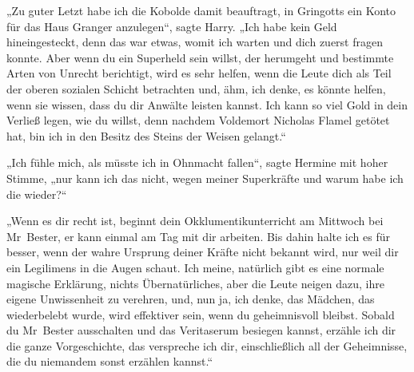 „Zu guter Letzt habe ich die Kobolde damit beauftragt, in Gringotts ein Konto für das Haus Granger anzulegen“, sagte Harry. „Ich habe kein Geld hineingesteckt, denn das war etwas, womit ich warten und dich zuerst fragen konnte. Aber wenn du ein Superheld sein willst, der herumgeht und bestimmte Arten von Unrecht berichtigt, wird es sehr helfen, wenn die Leute dich als Teil der oberen sozialen Schicht betrachten und, ähm, ich denke, es könnte helfen, wenn sie wissen, dass du dir Anwälte leisten kannst. Ich kann so viel Gold in dein Verließ legen, wie du willst, denn nachdem Voldemort Nicholas Flamel getötet hat, bin ich in den Besitz des Steins der Weisen gelangt.“

„Ich fühle mich, als müsste ich in Ohnmacht fallen“, sagte Hermine mit hoher Stimme, „nur kann ich das nicht, wegen meiner Superkräfte und warum habe ich die wieder?“

„Wenn es dir recht ist, beginnt dein Okklumentikunterricht am Mittwoch bei Mr~Bester, er kann einmal am Tag mit dir arbeiten. Bis dahin halte ich es für besser, wenn der wahre Ursprung deiner Kräfte nicht bekannt wird, nur weil dir ein Legilimens in die Augen schaut. Ich meine, natürlich gibt es eine normale magische Erklärung, nichts Übernatürliches, aber die Leute neigen dazu, ihre eigene Unwissenheit zu verehren, und, nun ja, ich denke, das Mädchen, das wiederbelebt wurde, wird effektiver sein, wenn du geheimnisvoll bleibst. Sobald du Mr~Bester ausschalten und das Veritaserum besiegen kannst, erzähle ich dir die ganze Vorgeschichte, das verspreche ich dir, einschließlich all der Geheimnisse, die du niemandem sonst erzählen kannst.“

